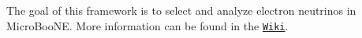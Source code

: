 The goal of this framework is to select and analyze electron neutrinos in Micro\+Boo\+NE. More information can be found in the \href{https://github.com/ubneutrinos/searchingfornues/wiki}{\tt Wiki}. 